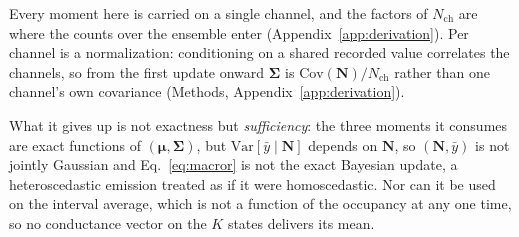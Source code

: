 Every moment here is carried on a single channel, and the
factors of $N_{\mathrm{ch}}$ are where the counts over the ensemble enter
(Appendix~\ref{app:derivation}).
Per channel is a normalization:
conditioning on a shared recorded value correlates the channels, so from the first update onward
$\boldsymbol{\Sigma}$ is $\mathrm{Cov}(\mathbf{N})/N_{\mathrm{ch}}$ rather than one channel's own
covariance (Methods, Appendix~\ref{app:derivation}).

What it gives up is not exactness but \emph{sufficiency}: the three moments it consumes are exact
functions of $(\boldsymbol{\mu},\boldsymbol{\Sigma})$, but $\mathrm{Var}[\bar y\mid\mathbf{N}]$ depends on
$\mathbf{N}$, so $(\mathbf{N},\bar y)$ is not jointly Gaussian and Eq.~\ref{eq:macror} is not the
exact Bayesian update, a heteroscedastic emission treated as if it were homoscedastic. Nor can it
be used on the interval average, which is not a function of the occupancy at any one time, so no
conductance vector on the $K$ states delivers its mean.


